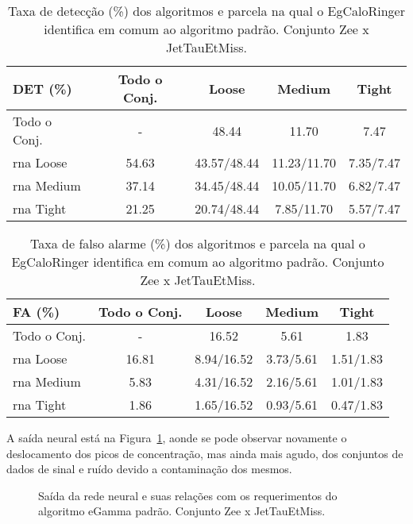 \begin{table}[htb]
\centering
\begin{tabular}{l cccc}
\hline
\hline
DET (\%)& Todo o Conj. & Loose & Medium & Tight \\
\hline
Todo o Conj.   &    - &  48.44 &  11.70 &  7.47  \\ 
\hline
\gls{rna} Loose & 54.63 & 43.57/48.44 & 11.23/11.70 & 7.35/7.47 \\
\hline
\gls{rna} Medium & 37.14 & 34.45/48.44 & 10.05/11.70 & 6.82/7.47 \\
\hline
\gls{rna} Tight &  21.25 & 20.74/48.44 & 7.85/11.70  & 5.57/7.47 \\
\hline
\hline
\end{tabular}
\caption{Taxa de detecção (\%) dos algoritmos e parcela na qual o EgCaloRinger
identifica em comum ao algoritmo padrão. Conjunto Zee x JetTauEtMiss.}
\label{tab:zeexjet_efic_det}
\end{table}

\begin{table}[htb]
\centering
\begin{tabular}{l cccc}
\hline
\hline
FA (\%)& Todo o Conj. & Loose & Medium & Tight \\
\hline
Todo o Conj.  &  - & 16.52 & 5.61 & 1.83 \\
\hline
\gls{rna} Loose  & 16.81 & 8.94/16.52 &  3.73/5.61 & 1.51/1.83 \\
\hline                                             
\gls{rna} Medium & 5.83  & 4.31/16.52 &  2.16/5.61 & 1.01/1.83 \\
\hline
\gls{rna} Tight  & 1.86  & 1.65/16.52 &  0.93/5.61 & 0.47/1.83 \\
\hline
\hline
\end{tabular}
\caption{Taxa de falso alarme (\%) dos algoritmos e parcela na qual o EgCaloRinger
identifica em comum ao algoritmo padrão. Conjunto Zee x JetTauEtMiss.}
\label{tab:zeexjet_efic_fa}
\end{table}

A saída neural está na Figura~\ref{fig:zeexjet_saidaneural}, aonde se pode
observar novamente o deslocamento dos picos de concentração, mas ainda mais
agudo, dos conjuntos de dados de sinal e ruído devido a contaminação dos mesmos.

\begin{figure}[ht]
\centering
{}
\caption{Saída da rede neural e suas relações com os requerimentos do algoritmo
eGamma padrão. Conjunto Zee x JetTauEtMiss. }
\label{fig:zeexjet_saidaneural}
\end{figure}


